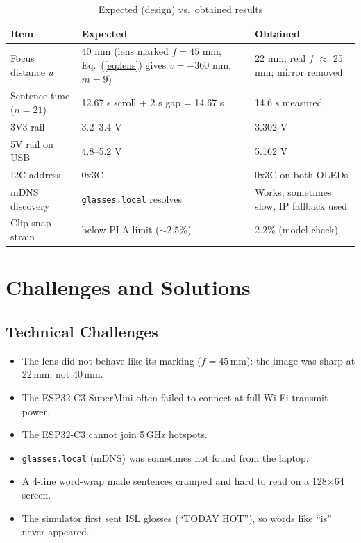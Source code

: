\documentclass[12pt,a4paper]{report}
\begin{document}
\begin{table}[H]
\centering
\caption{Expected (design) vs.\ obtained results}
\label{tab:compare}
\begin{tabularx}{\linewidth}{L{3.4cm} X X}
\toprule
\textbf{Item} & \textbf{Expected} & \textbf{Obtained} \\
\midrule
Focus distance $u$ & 40 mm (lens marked $f = 45$ mm; Eq.~(\ref{eq:lens}) gives $v = -360$ mm, $m = 9$) & 22 mm; real $f$ $\approx$ 25 mm; mirror removed \\
Sentence time ($n = 21$) & 12.67 s scroll + 2 s gap = 14.67 s & 14.6 s measured \\
3V3 rail & 3.2--3.4 V & 3.302 V \\
5V rail on USB & 4.8--5.2 V & 5.162 V \\
I2C address & 0x3C & 0x3C on both OLEDs \\
mDNS discovery & \texttt{glasses.local} resolves & Works; sometimes slow, IP fallback used \\
Clip snap strain & below PLA limit ($\sim$2.5\%) & 2.2\% (model check) \\
\bottomrule
\end{tabularx}
\end{table}

\section{Challenges and Solutions}

\subsection{Technical Challenges}
\begin{itemize}
  \item The lens did not behave like its marking ($f = 45$\,mm): the image was sharp at 22\,mm, not 40\,mm.
  \item The ESP32-C3 SuperMini often failed to connect at full Wi-Fi transmit power.
  \item The ESP32-C3 cannot join 5\,GHz hotspots.
  \item \texttt{glasses.local} (mDNS) was sometimes not found from the laptop.
  \item A 4-line word-wrap made sentences cramped and hard to read on a 128$\times$64 screen.
  \item The simulator first sent ISL glosses (``TODAY HOT''), so words like ``is'' never appeared.
\end{itemize}
\end{document}
